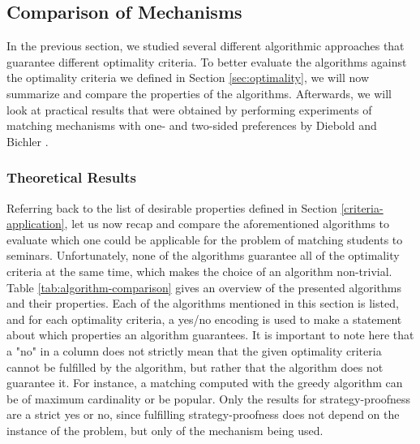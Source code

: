 \subsection{Comparison of Mechanisms}
In the previous section, we studied several different algorithmic approaches that guarantee different optimality criteria. To better evaluate the algorithms against the optimality criteria we defined in Section \ref{sec:optimality}, we will now summarize and compare the properties of the algorithms. Afterwards, we will look at practical results that were obtained by performing experiments of matching mechanisms with one- and two-sided preferences by Diebold and Bichler \cite{DieboldBenchmark}.

\subsubsection{Theoretical Results}
Referring back to the list of desirable properties defined in Section \ref{criteria-application}, let us now recap and compare the aforementioned algorithms to evaluate which one could be applicable for the problem of matching students to seminars. Unfortunately, none of the algorithms guarantee all of the optimality criteria at the same time, which makes the choice of an algorithm non-trivial. Table \ref{tab:algorithm-comparison} gives an overview of the presented algorithms and their properties. Each of the algorithms mentioned in this section is listed, and for each optimality criteria, a yes/no encoding is used to make a statement about which properties an algorithm guarantees. It is important to note here that a "no" in a column does not strictly mean that the given optimality criteria cannot be fulfilled by the algorithm, but rather that the algorithm does not guarantee it. For instance, a matching computed with the greedy algorithm can be of maximum cardinality or be popular. Only the results for strategy-proofness are a strict yes or no, since fulfilling strategy-proofness does not depend on the instance of the problem, but only of the mechanism being used. 

